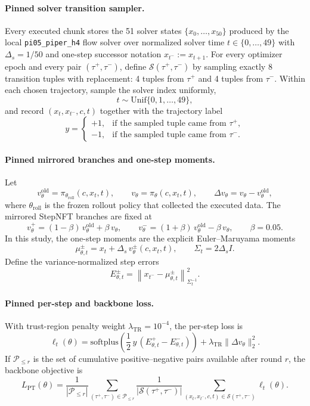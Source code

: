 \documentclass[10pt]{article}
\theoremstyle{plain}
\theoremstyle{definition}
\theoremstyle{remark}
\begin{document}
\paragraph{Pinned solver transition sampler.}
Every executed chunk stores the 51 solver states $\{x_0,\dots,x_{50}\}$ produced by the local \texttt{pi05\_piper\_h4} flow solver over normalized solver time $t\in\{0,\dots,49\}$ with $\Delta_s=1/50$ and one-step successor notation $x_{t^-}:=x_{t+1}$. For every optimizer epoch and every pair $(\tau^+,\tau^-)$, define $\mathcal S(\tau^+,\tau^-)$ by sampling exactly 8 transition tuples with replacement: 4 tuples from $\tau^+$ and 4 tuples from $\tau^-$. Within each chosen trajectory, sample the solver index uniformly,
\[
t\sim \mathrm{Unif}\{0,1,\dots,49\},
\]
and record $(x_t,x_{t^-},c,t)$ together with the trajectory label
\[
y=\begin{cases}
+1, & \text{if the sampled tuple came from }\tau^+,\\
-1, & \text{if the sampled tuple came from }\tau^-.
\end{cases}
\]

\paragraph{Pinned mirrored branches and one-step moments.}
Let
\[
v_{\theta}^{\mathrm{old}}=\pi_{\theta_{\mathrm{roll}}}(c,x_t,t),\qquad
v_{\theta}=\pi_{\theta}(c,x_t,t),\qquad
\Delta v_{\theta}=v_{\theta}-v_{\theta}^{\mathrm{old}},
\]
where $\theta_{\mathrm{roll}}$ is the frozen rollout policy that collected the executed data. The mirrored StepNFT branches are fixed at
\[
v_{\theta}^{+}=(1-\beta)\,v_{\theta}^{\mathrm{old}}+\beta\,v_{\theta},
\qquad
v_{\theta}^{-}=(1+\beta)\,v_{\theta}^{\mathrm{old}}-\beta\,v_{\theta},
\qquad
\beta=0.05.
\]
In this study, the one-step moments are the explicit Euler--Maruyama moments
\[
\mu^{\pm}_{\theta,t}=x_t+\Delta_s\,v_{\theta}^{\pm}(c,x_t,t),
\qquad
\Sigma_t=2\Delta_s I.
\]
Define the variance-normalized step errors
\[
E^{\pm}_{\theta,t}=\left\|x_{t^-}-\mu^{\pm}_{\theta,t}\right\|^2_{\Sigma_t^{-1}}.
\]

\paragraph{Pinned per-step and backbone loss.}
With trust-region penalty weight $\lambda_{\mathrm{TR}}=10^{-4}$, the per-step loss is
\[
\ell_t(\theta)
=
\mathrm{softplus}\!\left(\frac{1}{2}\,y\,(E^{+}_{\theta,t}-E^{-}_{\theta,t})\right)
+
\lambda_{\mathrm{TR}}\|\Delta v_{\theta}\|_2^2.
\]
If $\mathcal P_{\le r}$ is the set of cumulative positive--negative pairs available after round $r$, the backbone objective is
\[
L_{\mathrm{PT}}(\theta)=\frac{1}{|\mathcal P_{\le r}|}\sum_{(\tau^+,\tau^-)\in\mathcal P_{\le r}}
\frac{1}{|\mathcal S(\tau^+,\tau^-)|}
\sum_{(x_t,x_{t^-},c,t)\in\mathcal S(\tau^+,\tau^-)}
\ell_t(\theta).
\]
\end{document}
